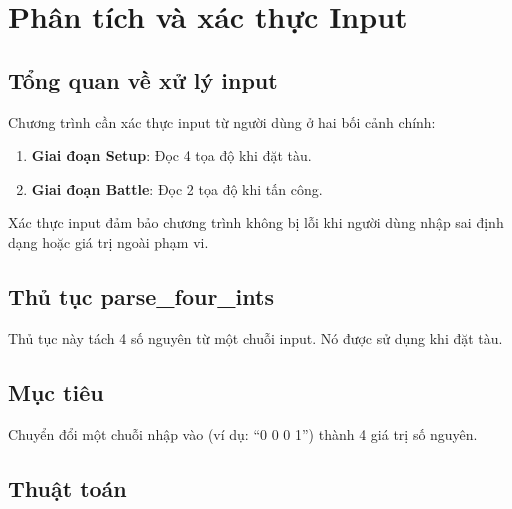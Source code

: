 
\section{Phân tích và xác thực Input}

\subsection{Tổng quan về xử lý input}

Chương trình cần xác thực input từ người dùng ở hai bối cảnh chính:
\begin{enumerate}
    \item \textbf{Giai đoạn Setup}: Đọc 4 tọa độ khi đặt tàu.
    \item \textbf{Giai đoạn Battle}: Đọc 2 tọa độ khi tấn công.
\end{enumerate}

Xác thực input đảm bảo chương trình không bị lỗi khi người dùng nhập sai định dạng hoặc giá trị ngoài phạm vi.

\subsection{Thủ tục parse\_four\_ints}

Thủ tục này tách 4 số nguyên từ một chuỗi input. Nó được sử dụng khi đặt tàu.

\subsection{Mục tiêu}

Chuyển đổi một chuỗi nhập vào (ví dụ: ``0 0 0 1'') thành 4 giá trị số nguyên.

\subsection{Thuật toán}

